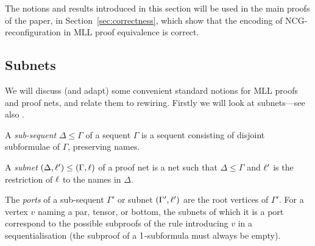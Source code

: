 \documentclass{lmcs}
\let\capsabbrev=\uppercase
\begin{document}
The notions and results introduced in this section will be used in the main proofs of the paper, in Section~\ref{sec:correctness}, which show that the encoding of \capsabbrev{ncg}-reconfiguration in \capsabbrev{mll} proof equivalence is correct.



\subsection*{Subnets}


We will discuss (and adapt) some convenient standard notions for \capsabbrev{mll} proofs and proof nets, and relate them to rewiring. Firstly we will look at subnets---see also \cite{Bellin-vandeWiele-1995}.

\begin{definition}
A \emph{sub-sequent} $\Delta\leq\Gamma$ of a sequent $\Gamma$ is a sequent consisting of disjoint subformulae of $\Gamma$, preserving names.
\end{definition}

\begin{definition}
A \emph{subnet} $(\Delta,\ell') \leq (\Gamma,\ell)$ of a proof net is a net such that $\Delta\leq\Gamma$ and $\ell'$ is the restriction of $\ell$ to the names in $\Delta$.
\end{definition}

The \emph{ports} of a sub-sequent $\Gamma'$ or subnet $(\Gamma',\ell')$ are the root vertices of $\Gamma'$. For a vertex $v$ naming a par, tensor, or bottom, the subnets of which it is a port correspond to the possible subproofs of the rule introducing $v$ in a sequentialisation (the subproof of a $1$-subformula must always be empty).
\end{document}
